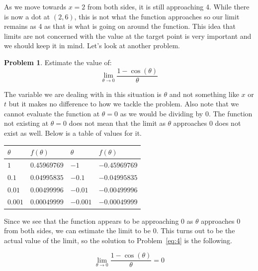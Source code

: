 \documentclass[12pt]{article}
\theoremstyle{definition}
\newtheorem{problem}{Problem}
\begin{document}
As we move towards $x=2$ from both sides, it is still approaching 4.
While there is now a dot at $(2, 6)$, this is not what the function approaches so our limit remains as 4 as that is what is going on around the function.
This idea that limits are not concerned with the value at the target point is very important and we should keep it in mind.
Let's look at another problem.

\begin{problem}
Estimate the value of:
\begin{equation*}
    \lim_{\theta\to0} \frac{1-\cos(\theta)}{\theta} \label{eq:4}
\end{equation*}
\end{problem}

The variable we are dealing with in this situation is $\theta$ and not something like $x$ or $t$ but it makes no difference to how we tackle the problem.
Also note that we cannot evaluate the function at $\theta=0$ as we would be dividing by 0.
The function not existing at $\theta=0$ does not mean that the limit as $\theta$ approaches 0 does not exist as well.
Below is a table of values for it.

\begin{table}[h]
    \renewcommand{\arraystretch}{1.5}
    \centering
    \begin{tabular}{>{\centering\arraybackslash}m{1.5cm}|>{\centering\arraybackslash}m{2.5cm}|>{\centering\arraybackslash}m{1.5cm}|>{\centering\arraybackslash}m{2.5cm}}
        $\theta$ & $f(\theta)$   & $\theta$ & $f(\theta)$           \\ \hline
        $1$      & $0.45969769	$ & $-1$     & $-0.45969769        $ \\
        $0.1$    & $0.04995835$  & $-0.1$   & $-0.04995835$         \\
        $0.01$   & $0.00499996$  & $-0.01$  & $-0.00499996$         \\
        $0.001$  & $0.00049999$  & $-0.001$ & $-0.00049999$
    \end{tabular}
\end{table}

Since we see that the function appears to be approaching $0$ as $\theta$ approaches 0 from both sides, we can estimate the limit to be 0.
This turns out to be the actual value of the limit, so the solution to Problem~\eqref{eq:4} is the following.

\begin{equation}
    \lim_{\theta\to0} \frac{1-\cos(\theta)}{\theta} = 0
\end{equation}
\end{document}
